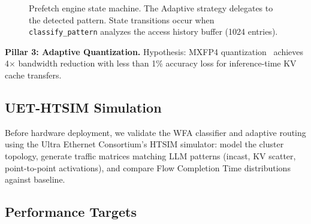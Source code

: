\documentclass[11pt,letterpaper]{article}
\theoremstyle{definition}
\begin{document}
\begin{figure}[htbp]
{%
}
\caption{Prefetch engine state machine. The Adaptive strategy delegates to the detected pattern. State transitions occur when \texttt{classify\_pattern} analyzes the access history buffer (1024 entries).}
\label{fig:prefetch-fsm}
\end{figure}

\textbf{Pillar 3: Adaptive Quantization.} Hypothesis: MXFP4 quantization~\cite{rouhani2023mxfp4} achieves 4$\times$ bandwidth reduction with less than 1\% accuracy loss for inference-time KV cache transfers.

\subsection{UET-HTSIM Simulation}

Before hardware deployment, we validate the WFA classifier and adaptive routing using the Ultra Ethernet Consortium's HTSIM simulator: model the cluster topology, generate traffic matrices matching LLM patterns (incast, KV scatter, point-to-point activations), and compare Flow Completion Time distributions against baseline.

\subsection{Performance Targets}
\end{document}
